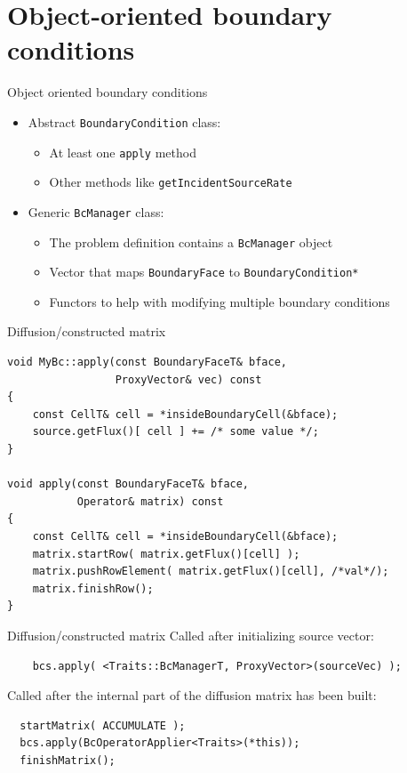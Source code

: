\documentclass{beamer}
\begin{document}
\section{Object-oriented boundary conditions}
\begin{frame}[fragile]{Object oriented boundary conditions}
  \begin{itemize}
\item Abstract \verb|BoundaryCondition| class:
  \begin{itemize}
    \item At least one \verb|apply| method
    \item Other methods like \verb|getIncidentSourceRate|
  \end{itemize}

\item Generic \verb|BcManager| class:
  \begin{itemize}
    \item The problem definition contains a \verb|BcManager| object
    \item Vector that maps \verb|BoundaryFace| to \verb|BoundaryCondition*|
    \item Functors to help with modifying multiple boundary conditions
  \end{itemize}
\end{itemize}
\end{frame}

\begin{frame}[fragile]{Diffusion/constructed matrix}
  \begin{verbatim}
void MyBc::apply(const BoundaryFaceT& bface,
                 ProxyVector& vec) const
{
    const CellT& cell = *insideBoundaryCell(&bface);
    source.getFlux()[ cell ] += /* some value */;
}

void apply(const BoundaryFaceT& bface,
           Operator& matrix) const
{
    const CellT& cell = *insideBoundaryCell(&bface);
    matrix.startRow( matrix.getFlux()[cell] );
    matrix.pushRowElement( matrix.getFlux()[cell], /*val*/);
    matrix.finishRow();
}
  \end{verbatim}
\end{frame}

\begin{frame}[fragile]{Diffusion/constructed matrix}
Called after initializing source vector:
\begin{verbatim}
	bcs.apply( <Traits::BcManagerT, ProxyVector>(sourceVec) );
\end{verbatim}
  
Called after the internal part of the diffusion matrix has been built:
\begin{verbatim}
  startMatrix( ACCUMULATE );
  bcs.apply(BcOperatorApplier<Traits>(*this));
  finishMatrix();
\end{verbatim}
\end{frame}
\end{document}
